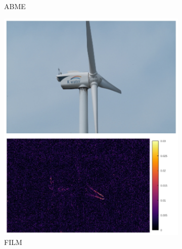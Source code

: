 \documentclass{article}
\begin{document}
\begin{figure}[h]
\begin{subfigure}{0.125\textwidth}
    \caption{ABME}
\end{subfigure}%
\begin{subfigure}{0.125\textwidth}
	\centering
    \includegraphics[width=1\linewidth]{qua_imgs/TEST02_045_f0465_film.jpg}
    \caption{FILM}
\end{subfigure}%
\begin{subfigure}{0.125\textwidth}
	\centering

\end{subfigure}
\end{figure}
\end{document}

